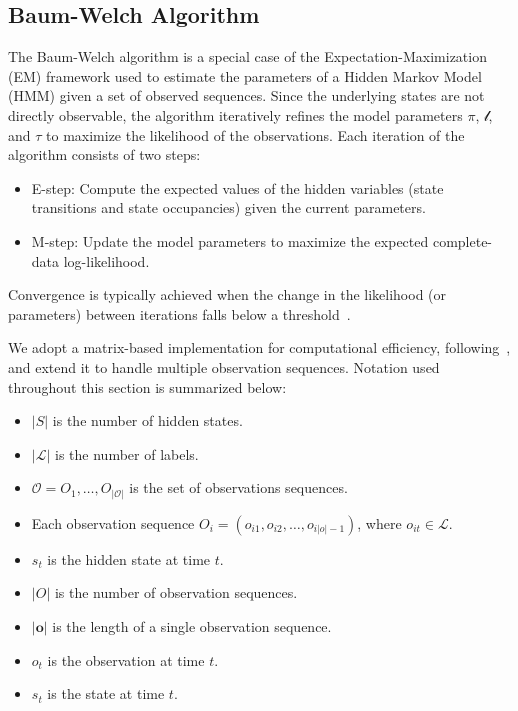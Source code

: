 \subsection{Baum-Welch Algorithm}\label{subsec:baum-welch}
The Baum-Welch algorithm is a special case of the Expectation-Maximization (EM) framework used to estimate the parameters of a Hidden Markov Model (HMM) given a set of observed sequences. Since the underlying states are not directly observable, the algorithm iteratively refines the model parameters $\pi$, $\mathscr{l}$, and $\tau$ to maximize the likelihood of the observations.
Each iteration of the algorithm consists of two steps:
\begin{itemize}
    \item E-step: Compute the expected values of the hidden variables (state transitions and state occupancies) given the current parameters.
    \item M-step: Update the model parameters to maximize the expected complete-data log-likelihood.
\end{itemize}

Convergence is typically achieved when the change in the likelihood (or parameters) between iterations falls below a threshold~\cite{Rabiner89}.

We adopt a matrix-based implementation for computational efficiency, following~\cite{aaholmbaum}, and extend it to handle multiple observation sequences. Notation used throughout this section is summarized below:
\begin{itemize}
    \item $|S|$ is the number of hidden states.
    \item $|\mathcal{L}|$ is the number of labels.
    \item $\mathcal{O} = {O_1, \ldots, O_{|\mathcal{O}|}}$  is the set of observations sequences.
    \item Each observation sequence $O_i = (o_{i1}, o_{i2}, \ldots, o_{i|o|-1 })$, where $o_{it} \in \mathcal{L}$.
    \item $s_t$ is the hidden state at time $t$.
    \item $|O|$ is the number of observation sequences.
    \item $|\mathbf{o}|$ is the length of a single observation sequence.
    \item $o_t$ is the observation at time $t$.
    \item $s_t$ is the state at time $t$.
\end{itemize}

